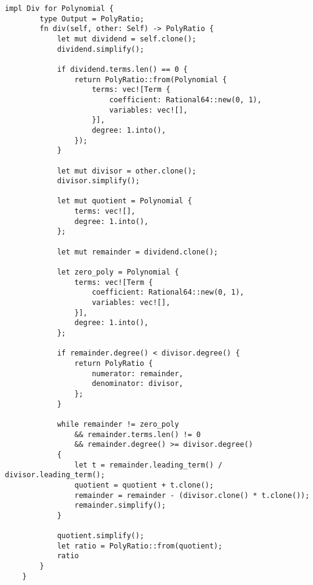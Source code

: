 \begin{lstlisting}[caption={The implementation of the division operation for the \texttt{Polynomial} struct}, label={lst:polynomial-div}]
    impl Div for Polynomial {
        type Output = PolyRatio;
        fn div(self, other: Self) -> PolyRatio {
            let mut dividend = self.clone();
            dividend.simplify();
    
            if dividend.terms.len() == 0 {
                return PolyRatio::from(Polynomial {
                    terms: vec![Term {
                        coefficient: Rational64::new(0, 1),
                        variables: vec![],
                    }],
                    degree: 1.into(),
                });
            }
    
            let mut divisor = other.clone();
            divisor.simplify();
    
            let mut quotient = Polynomial {
                terms: vec![],
                degree: 1.into(),
            };
    
            let mut remainder = dividend.clone();
    
            let zero_poly = Polynomial {
                terms: vec![Term {
                    coefficient: Rational64::new(0, 1),
                    variables: vec![],
                }],
                degree: 1.into(),
            };
    
            if remainder.degree() < divisor.degree() {
                return PolyRatio {
                    numerator: remainder,
                    denominator: divisor,
                };
            }
    
            while remainder != zero_poly
                && remainder.terms.len() != 0
                && remainder.degree() >= divisor.degree()
            {
                let t = remainder.leading_term() / divisor.leading_term();
                quotient = quotient + t.clone();
                remainder = remainder - (divisor.clone() * t.clone());
                remainder.simplify();
            }
    
            quotient.simplify();
            let ratio = PolyRatio::from(quotient);
            ratio
        }
    }
\end{lstlisting}        

